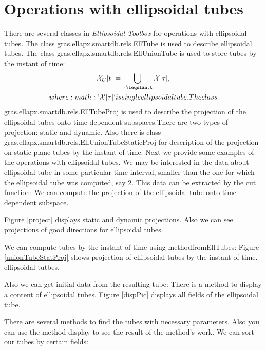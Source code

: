 \documentclass[letterpaper,10pt,english]{sphinxmanual}
\begin{document}
\section{Operations with ellipsoidal tubes}
\label{chap_implement:operations-with-ellipsoidal-tubes}
There are several classes in \emph{Ellipsoidal Toolbox} for operations with
ellipsoidal tubes. The class gras.ellapx.smartdb.rels.EllTube is used to
describe ellipsoidal tubes. The class
gras.ellapx.smartdb.rels.EllUnionTube is used to store tubes by the
instant of time:
\begin{gather}
\begin{split}{\mathcal X}_{U}[t]=\bigcup \limits_{\tau\leqslantt}{\mathcal X}[\tau],\end{split}\notag\\\begin{split}where :math:`{\mathcal X}[\tau]` is single ellipsoidal tube. The class\end{split}\notag
\end{gather}
gras.ellapx.smartdb.rels.EllTubeProj is used to describe the projection
of the ellipsoidal tubes onto time dependent subspaces.There are two
types of projection: static and dynamic. Also there is class
gras.ellapx.smartdb.rels.EllUnionTubeStaticProj for description of the
projection on static plane tubes by the instant of time. Next we provide
some examples of the operations with ellipsoidal tubes. We may be
interested in the data about ellipsoidal tube in some particular time
interval, smaller than the one for which the ellipsoidal tube was
computed, say 2\leqslantt{}. This data can be extracted
by the cut function: We can compute the projection of the ellipsoidal
tube onto time-dependent subspace.

Figure \ref{project} displays static and dynamic projections.
Also we can see projections of good directions for ellipsoidal tubes.

We can compute tubes by the instant of time using methodfromEllTubes:
Figure \ref{unionTubeStatProj} shows projection of ellipsoidal
tubes by the instant of time. ellipsoidal tutbes.

Also we can get initial data from the resulting tube: There is a method
to display a content of ellipsoidal tubes. Figure \ref{dispPic}
displays all fields of the ellipsoidal tube.

There are several methods to find the tubes with necessary parameters.
Also you can use the method display to see the result of the method’s
work. We can sort our tubes by certain fields:
\end{document}
